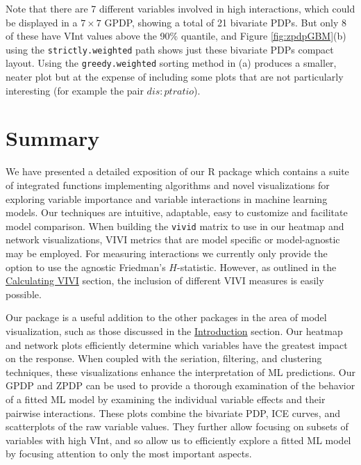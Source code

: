 Note that there are 7 different variables involved in high interactions, which could be displayed in a \(7 \times 7\) GPDP, showing a total of 21 bivariate PDPs. But only 8 of these have VInt values above the 90\% quantile, and Figure \ref{fig:zpdpGBM}(b) using the \texttt{strictly.weighted} path shows just these bivariate PDPs compact layout. Using the \texttt{greedy.weighted} sorting method in (a) produces a smaller, neater plot but at the expense of including some plots that are not particularly interesting (for example the pair \(dis:ptratio\)).

\hypertarget{summary}{%
\section{Summary}\label{summary}}

We have presented a detailed exposition of our R package  which contains a suite of integrated functions implementing algorithms and novel visualizations for exploring variable importance and variable interactions in machine learning models. Our techniques are intuitive, adaptable, easy to customize and facilitate model comparison. When building the \texttt{vivid} matrix to use in our heatmap and network visualizations, VIVI metrics that are model specific or model-agnostic may be employed. For measuring interactions we currently only provide the option to use the agnostic Friedman's \(H\)-statistic. However, as outlined in the \protect\hyperlink{data}{Calculating VIVI} section, the inclusion of different VIVI measures is easily possible.

Our  package is a useful addition to the other packages in the area of model visualization, such as those discussed in the \protect\hyperlink{introduction}{Introduction} section. Our heatmap and network plots efficiently determine which variables have the greatest impact on the response. When coupled with the seriation, filtering, and clustering techniques, these visualizations enhance the interpretation of ML predictions. Our GPDP and ZPDP can be used to provide a thorough examination of the behavior of a fitted ML model by examining the individual variable effects and their pairwise interactions. These plots combine the bivariate PDP, ICE curves, and scatterplots of the raw variable values. They further allow focusing on subsets of variables with high VInt, and so allow us to efficiently explore a fitted ML model by focusing attention to only the most important aspects.

